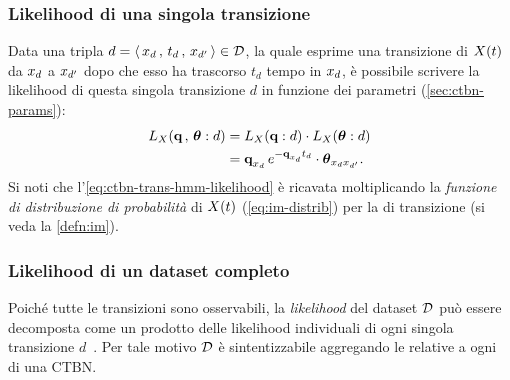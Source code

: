 \subsubsection{Likelihood di una singola transizione}
\label{sec:ctbn-likelihood-single-trans-single-hmp}
Data una tripla $d=\langle \,\mathnormal{x}_{d}\,,\,t_d\,,\,\mathnormal{x}_{d^{\prime}}\,\rangle\in\mathcal{D}$, la quale esprime una transizione di $\mathnormal{X}(t)$ da $\mathnormal{x}_d$ a $\mathnormal{x}_{d^{\prime}}$ dopo che esso ha trascorso $t_d$ tempo in $\mathnormal{x}_d$, è possibile scrivere la likelihood di questa singola transizione $d$ in funzione dei parametri (\ref{sec:ctbn-params}):
\begin{equation}
\label{eq:ctbn-trans-hmm-likelihood}
\begin{split}
L_{\mathnormal{X}}(\boldsymbol{\textbf{\text{q}}}\,,\,\boldsymbol{\textbf{\text{$\theta$}}}:d) &= L_{\mathnormal{X}}(\boldsymbol{\textbf{\text{q}}}:d) \cdot L_{\mathnormal{X}}(\boldsymbol{\textbf{\text{$\theta$}}}:d) \\
&= \boldsymbol{\textbf{\text{q}}}_{\mathnormal{x}_d}\,e^{-\boldsymbol{\textbf{\text{q}}}_{\mathnormal{x}_d}t_d} \cdot \boldsymbol{\textbf{\text{$\theta$}}}_{\mathnormal{x}_{d}\mathnormal{x}_{d^{\prime}}}\text{.}
\end{split}
\end{equation}
Si noti che l'\autoref{eq:ctbn-trans-hmm-likelihood} è ricavata moltiplicando la \emph{funzione di distribuzione di probabilità} di $\mathnormal{X}(t)$ (\autoref{eq:im-distrib}) per la \emph{} di transizione (si veda la \autoref{defn:im}).

\subsubsection{Likelihood di un dataset completo}
\label{sec:ctbn-likelihood-dataset}
Poiché tutte le transizioni sono osservabili, la \emph{likelihood} del dataset $\mathcal{D}$ può essere decomposta come un prodotto delle likelihood individuali di ogni singola transizione $d$~\citep[si veda][3]{Nodelman2002}. Per tale motivo $\mathcal{D}$ è sintentizzabile aggregando le \emph{\stats{}} relative a ogni \mprocess*{} \cond*{} di una \acs{CTBN}.

